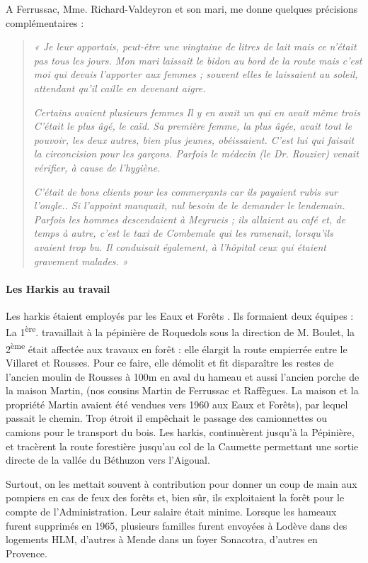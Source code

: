 A Ferrussac, Mme. Richard-Valdeyron et son mari, me donne quelques précisions
complémentaires :

\begin{quote}
\textit{« Je leur apportais, peut-être une vingtaine de litres de lait mais ce n’était pas tous
les jours. Mon mari laissait le bidon au bord de la route mais c’est moi qui devais
l’apporter aux femmes ; souvent elles le laissaient au soleil, attendant qu’il caille en
devenant aigre.}

\textit{Certains avaient plusieurs femmes Il y en avait un qui en avait même trois C’était le
plus âgé, le caïd. Sa première femme, la plus âgée, avait tout le pouvoir, les deux
autres, bien plus jeunes, obéissaient. C’est lui qui faisait la circoncision pour les
garçons. Parfois le médecin (le Dr. Rouzier) venait vérifier, à cause de l’hygiène.}

\textit{C’était de bons clients pour les commerçants car ils payaient rubis sur l’ongle.. Si
l’appoint manquait, nul besoin de le demander le lendemain. Parfois les hommes
descendaient à Meyrueis ; ils allaient au café et, de temps à autre, c’est le taxi de
Combemale qui les ramenait, lorsqu’ils avaient trop bu. Il conduisait également, à
l’hôpital ceux qui étaient gravement malades. »}
\end{quote}

\paragraph{Les Harkis au travail}

Les harkis étaient employés par les \og Eaux et Forêts \fg{}. Ils formaient deux équipes :
La 1\textsuperscript{ère}. travaillait à la pépinière de Roquedols sous la direction de M. Boulet, la 2\textsuperscript{ème}
était affectée aux travaux en forêt : elle élargit la route empierrée entre le Villaret et
Rousses. Pour ce faire, elle démolit et fit disparaître les restes de l’ancien moulin de
Rousses à 100m en aval du hameau et aussi l’ancien porche de la maison Martin, (nos
cousins Martin de Ferrussac et Raffègues. La maison et la propriété Martin avaient été vendues vers
1960 aux Eaux et Forêts), par lequel passait le chemin. Trop étroit il empêchait le passage
des camionnettes ou camions pour le transport du bois.
Les harkis, continuèrent jusqu’à la Pépinière, et tracèrent la route forestière
jusqu’au col de la Caumette permettant une sortie directe de la vallée du Béthuzon vers
l’Aigoual.

Surtout, on les mettait souvent à contribution pour donner un coup de main aux
pompiers en cas de feux des forêts et, bien sûr, ils exploitaient la forêt pour le compte
de l’Administration. Leur salaire était minime.
Lorsque les hameaux furent supprimés en 1965, plusieurs familles furent envoyées à
Lodève dans des logements HLM, d’autres à Mende dans un foyer Sonacotra, d’autres
en Provence.

